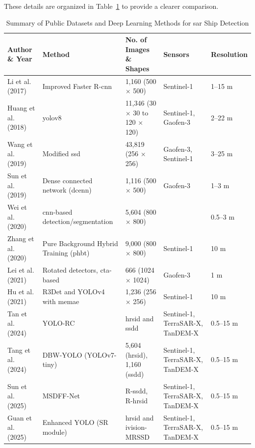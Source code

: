 \documentclass{article}
\begin{document}
	
	These details are organized in Table~\ref{tab:sar_ship_detection} to provide a clearer comparison.
	
	\begin{table}[h!]
		\centering
		\footnotesize
		\begin{tabularx}{\textwidth}{@{}lXlXl@{}}
			\toprule
			\textbf{Author \& Year} & \textbf{Method} & \textbf{No. of Images \& Shapes} & \textbf{Sensors} & \textbf{Resolution} \\
			\midrule
			Li et al. (2017) \cite{8124934} & Improved Faster R-\acrshort{cnn} & 1,160 (500 × 500) & Sentinel-1 & 1–15 m \\
			Huang et al. (2018) \cite{8124929} & \acrshort{yolov8} & 11,346 (30 × 30 to 120 × 120) & Sentinel-1, Gaofen-3 & 2–22 m \\
			Wang et al. (2019) \cite{rs11070765} & Modified \acrshort{ssd} & 43,819 (256 × 256) & Gaofen-3, Sentinel-1 & 3–25 m \\
			Sun et al. (2019) \cite{R19097} & Dense connected network (\acrshort{dcenn}) & 1,116 (500 × 500) & Gaofen-3 & 1–3 m \\
			Wei et al. (2020) \cite{9127939} & \acrshort{cnn}-based detection/segmentation & 5,604 (800 × 800) &   & 0.5–3 m \\
			Zhang et al. (2020) \cite{rs12182997} & Pure Background Hybrid Training (\acrshort{phbt}) & 9,000 (800 × 800) & Sentinel-1 & 10 m \\
			Lei et al. (2021) \cite{rs13245104} & Rotated detectors, \acrshort{cta}-based & 666 (1024 × 1024) & Gaofen-3 & 1 m \\
			Hu et al. (2021)  \cite{s21248478} & R3Det and YOLOv4 with \acrshort{memae} & 1,236 (256 × 256) & Sentinel-1 & 10 m \\
			Tan et al. (2024) \cite{tan2024yolo} & YOLO-RC & \acrshort{hrsid} and \acrshort{ssdd} & Sentinel-1, TerraSAR-X, TanDEM-X & 0.5–15 m \\
			Tang et al. (2024) \cite{tang2024dbw} & DBW-YOLO (YOLOv7-tiny) & 5,604 (\acrshort{hrsid}), 1,160 (\acrshort{ssdd}) & Sentinel-1, TerraSAR-X, TanDEM-X & 0.5–15 m \\
			Sun et al. (2025) \cite{sun2025arbitrary} & MSDFF-Net & R-\acrshort{ssdd}, R-\acrshort{hrsid} & Sentinel-1, TerraSAR-X, TanDEM-X & 0.5–15 m \\
			Guan et al. (2025) \cite{guan2025sar} & Enhanced YOLO (SR module) & \acrshort{hrsid} and \acrshort{ivision}-MRSSD & Sentinel-1, TerraSAR-X, TanDEM-X & 0.5–15 m \\
			\bottomrule
		\end{tabularx}
		\caption{Summary of Public Datasets and Deep Learning Methods for \acrshort{sar} Ship Detection}
		\label{tab:sar_ship_detection}
	\end{table}
	
\end{document}
